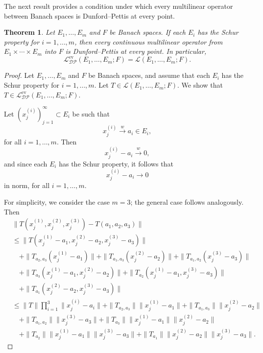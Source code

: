 \documentclass[12 pt]{article}%
\newtheorem{theorem}{Theorem}[section]
\newtheorem{final remark}[theorem]{Final Remark}
\begin{document}
The next result provides a condition under which every multilinear operator between Banach spaces is Dunford–Pettis at every point.

\begin{theorem}\label{DPEVS}
	Let $E_1,\dots,E_m$ and $F$ be Banach spaces. If each $E_i$ has the Schur property for $i=1,\dots,m$, then every continuous multilinear operator from $E_1 \times \cdots \times E_m$ into $F$ is Dunford–Pettis at every point. In particular,
	\begin{equation*}
		\mathcal{L_{DP}^{\mathrm{ev}}}(E_1,\dots,E_m;F) = \mathcal{L}(E_1,\dots,E_m;F).
	\end{equation*}
\end{theorem}

\begin{proof}
	Let $E_1,\dots,E_m$ and $F$ be Banach spaces, and assume that each $E_i$ has the Schur property for $i=1,\dots,m$. Let $T \in \mathcal{L}(E_1,\dots,E_m;F)$. We show that $T \in \mathcal{L_{DP}^{\mathrm{ev}}}(E_1,\dots,E_m;F)$.
	
	Let $(x_j^{(i)})_{j=1}^{\infty} \subset E_i$ be such that
	\begin{equation*}
		x_j^{(i)} \overset{w}{\to} a_i \in E_i,
	\end{equation*}
	for all $i=1,\dots,m$. Then
	\begin{equation*}
		x_j^{(i)} - a_i \overset{w}{\to} 0,
	\end{equation*}
	and since each $E_i$ has the Schur property, it follows that
	\begin{equation*}
		x_j^{(i)} - a_i \longrightarrow 0
	\end{equation*}
	in norm, for all $i=1,\dots,m$.
	
	For simplicity, we consider the case $m=3$; the general case follows analogously. Then
	\begin{align*}
		&\|T(x_j^{(1)},x_j^{(2)},x_j^{(3)}) - T(a_1,a_2,a_3)\| \\
		&\le \|T(x_j^{(1)}-a_1, x_j^{(2)}-a_2, x_j^{(3)}-a_3)\| \\
		&\quad + \|T_{a_2,a_3}(x_j^{(1)}-a_1)\| + \|T_{a_1,a_3}(x_j^{(2)}-a_2)\| + \|T_{a_1,a_2}(x_j^{(3)}-a_3)\| \\
		&\quad + \|T_{a_3}(x_j^{(1)}-a_1, x_j^{(2)}-a_2)\| + \|T_{a_2}(x_j^{(1)}-a_1, x_j^{(3)}-a_3)\| \\
		&\quad + \|T_{a_1}(x_j^{(2)}-a_2, x_j^{(3)}-a_3)\| \\
		&\le \|T\| \prod_{i=1}^{3} \|x_j^{(i)} - a_i\|
		+ \|T_{a_2,a_3}\| \|x_j^{(1)} - a_1\|
		+ \|T_{a_1,a_3}\| \|x_j^{(2)} - a_2\| \\
		&\quad + \|T_{a_1,a_2}\| \|x_j^{(3)} - a_3\|
		+ \|T_{a_3}\| \|x_j^{(1)} - a_1\| \|x_j^{(2)} - a_2\| \\
		&\quad + \|T_{a_2}\| \|x_j^{(1)} - a_1\| \|x_j^{(3)} - a_3\|
		+ \|T_{a_1}\| \|x_j^{(2)} - a_2\| \|x_j^{(3)} - a_3\|.
	\end{align*}
	

\end{proof}
\end{document}
